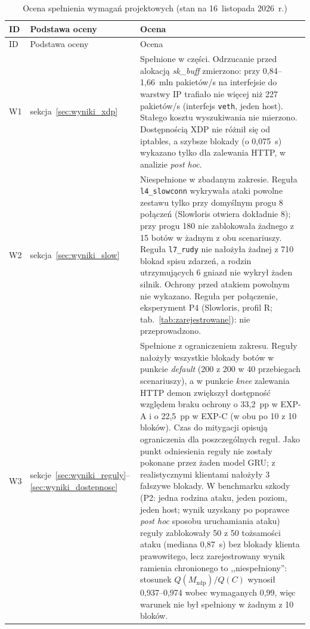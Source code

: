 \documentclass[a4paper,12pt]{article}
\begin{document}
\begingroup
\small
\setlength{\LTcapwidth}{\linewidth}
\begin{longtable}{@{}L{0.8cm}L{2.8cm}L{\dimexpr\linewidth-3.6cm-4\tabcolsep\relax}@{}}
\caption{Ocena spełnienia wymagań projektowych (stan na 16~listopada 2026~r.)}\label{tab:ocena_wymagan} \\
\toprule
ID & Podstawa oceny & Ocena \\
\midrule
\endfirsthead
\toprule
ID & Podstawa oceny & Ocena \\
\midrule
\endhead
W1 & sekcja~\ref{sec:wyniki_xdp} & Spełnione w części. Odrzucanie przed alokacją \textit{sk\_buff} zmierzono: przy 0,84--1,66~mln pakietów/s na interfejsie do warstwy IP trafiało nie więcej niż 227 pakietów/s (interfejs \texttt{veth}, jeden host). Stałego kosztu wyszukiwania nie mierzono. Dostępnością XDP nie różnił się od iptables, a szybsze blokady (o 0,075~s) wykazano tylko dla zalewania HTTP, w analizie \textit{post hoc}. \\
W2 & sekcja~\ref{sec:wyniki_slow} & Niespełnione w zbadanym zakresie. Reguła \texttt{l4\_slowconn} wykrywała ataki powolne zestawu tylko przy domyślnym progu 8 połączeń (Slowloris otwiera dokładnie 8); przy progu 180 nie zablokowała żadnego z 15 botów w żadnym z obu scenariuszy. Reguła \texttt{l7\_rudy} nie nałożyła żadnej z 710 blokad spisu zdarzeń, a rodzin utrzymujących 6 gniazd nie wykrył żaden silnik. Ochrony przed atakiem powolnym nie wykazano. Reguła per połączenie, eksperyment P4 (Slowloris, profil R; tab.~\ref{tab:zarejestrowane}): nie przeprowadzono. \\
W3 & sekcje~\ref{sec:wyniki_reguly}--\ref{sec:wyniki_dostepnosc} & Spełnione z ograniczeniem zakresu. Reguły nałożyły wszystkie blokady botów w punkcie \textit{default} (200 z 200 w 40 przebiegach scenariuszy), a w punkcie \textit{knee} zalewania HTTP demon zwiększył dostępność względem braku ochrony o 33,2~pp w EXP-A i o 22,5~pp w EXP-C (w obu po 10 z 10 bloków). Czas do mitygacji opisują ograniczenia dla poszczególnych reguł. Jako punkt odniesienia reguły nie zostały pokonane przez żaden model GRU; z realistycznymi klientami nałożyły 3 fałszywe blokady. W benchmarku szkody (P2: jedna rodzina ataku, jeden poziom, jeden host; wynik uzyskany po poprawce \textit{post hoc} sposobu uruchamiania ataku) reguły zablokowały 50 z 50 tożsamości ataku (mediana 0,87~s) bez blokady klienta prawowitego, lecz zarejestrowany wynik ramienia chronionego to ,,niespełniony'': stosunek $Q(M_{\mathrm{xdp}})/Q(C)$ wynosił 0,937--0,974 wobec wymaganych 0,99, więc warunek nie był spełniony w żadnym z 10 bloków. \\

\end{longtable}
\end{document}

